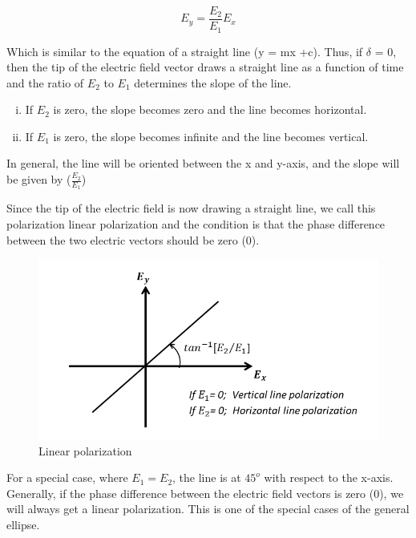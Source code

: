 \begin{equation}
E_y = \frac{E_2}{E_1}E_x
\end{equation}

Which is similar to the equation of a straight line (y = mx +c). Thus, if $\delta$ = 0, then the tip of the electric field vector draws a straight line as a function of time and the ratio of $ E_2 $ to $ E_1 $ determines the slope of the line.
\begin{enumerate}[(i)]
\item If $ E_2 $ is zero, the slope becomes zero and the line becomes horizontal.
\item If $ E_1 $ is zero, the slope becomes infinite and the line becomes vertical.
\end{enumerate} 
In general, the line will be oriented between the x and y-axis, and the slope will be given by ($\frac{E_2}{E_1}$)

Since the tip of the electric field is now drawing a straight line, we call this polarization linear polarization and the condition is that the phase difference between the two electric vectors should be zero (0).
\begin{figure}[h]
\centering
\includegraphics[width=1\linewidth]{./graphics/linear_polarization}
\caption{Linear polarization}
\end{figure}

For a special case, where $  E_1=E_2 $, the line is at $ 45^{o}$ with respect to the x-axis. Generally, if the phase difference between the electric field vectors is zero (0), we will always get a linear polarization. This is one of the special cases of the general ellipse.

